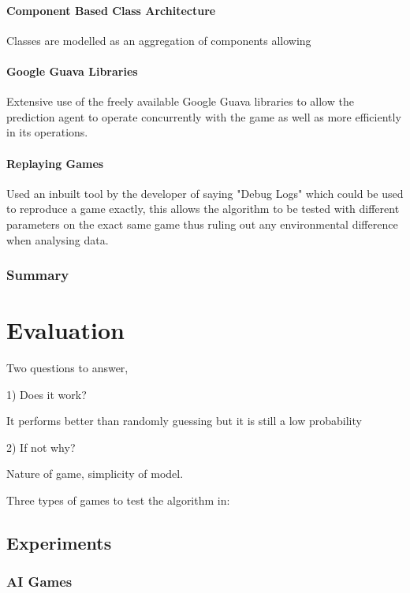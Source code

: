 \documentclass[parskip]{cs4rep}
\begin{document}
\subsubsection{Component Based Class Architecture}

Classes are modelled as an aggregation of components allowing

\subsubsection{Google Guava Libraries}

Extensive use of the freely available Google Guava libraries to allow the prediction agent to operate concurrently with the game as well as more efficiently in its operations.

\subsubsection{Replaying Games}
Used an inbuilt tool by the developer of saying "Debug Logs" which could be used to reproduce a game exactly, this allows the algorithm to be tested with different parameters on the exact same game thus ruling out any environmental difference when analysing data.

\subsection{Summary}

\chapter{Evaluation}

Two questions to answer, 

1) Does it work?

It performs better than randomly guessing but it is still a low probability

2) If not why?

Nature of game, simplicity of model.

Three types of games to test the algorithm in:

\section{Experiments}

\subsection{AI Games}
\end{document}
